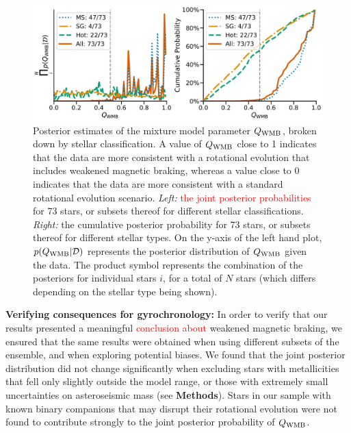 \documentclass[12pt]{article}
\newcommand{\rtwo}[1]{\textcolor{red}{{#1}}}
\begin{document}
\begin{figure}
	\centering
	\includegraphics[width=\textwidth]{modelresults.pdf}
	\caption{Posterior estimates of the mixture model parameter $Q_{\rm WMB}$, broken down by stellar classification. A value of $Q_{\rm WMB}$ close to 1 indicates that the data are more consistent with a rotational evolution that includes weakened magnetic braking, whereas a value close to 0 indicates that the data are more consistent with a standard rotational evolution scenario. \textit{Left:} \rtwo{the joint posterior probabilities} for 73 stars, or subsets thereof for different stellar classifications. \textit{Right:} the cumulative posterior probability for 73 stars, or subsets thereof for different stellar types. On the y-axis of the left hand plot, $p(Q_{\rm WMB} | \mathcal{D})$ represents the posterior distribution of $Q_{\rm WMB}$ given the data. The product symbol represents the combination of the posteriors for individual stars $i$, for a total of $N$ stars (which differs depending on the stellar type being shown).}
	\label{fig:gyroresults}
\end{figure}

\textbf{Verifying consequences for gyrochronology:} In order to verify that our results presented a meaningful \rtwo{conclusion about} weakened magnetic braking, we ensured that the same results were obtained when using different subsets of the ensemble, and when exploring potential biases. We found that the joint posterior distribution did not change significantly when excluding stars with metallicities that fell only slightly outside the model range, or those with extremely small uncertainties on asteroseismic mass (see \textbf{Methods}). Stars in our sample with known binary companions that may disrupt their rotational evolution were not found to contribute strongly to the joint posterior probability of $Q_{\rm WMB}$. 
\end{document}
